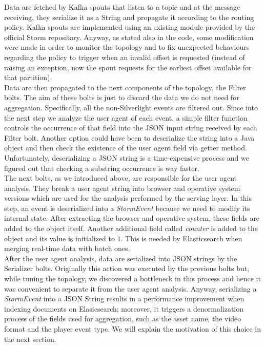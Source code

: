Data are fetched by Kafka spouts that listen to a topic and at the message receiving, they serialize it as a String and propagate it according to the routing policy. Kafka spouts are implemented using an existing module provided by the official Storm repository. Anyway, as stated also in the code, some modification were made in order to monitor the topology and to fix unexpected behaviours regarding the policy to trigger when an invalid offset is requested (instead of raising an exception, now the spout requests for the earliest offset available for that partition). \\
Data are then propagated to the next components of the topology, the Filter bolts. The aim of these bolts is just to discard the data we do not need for aggregation. Specifically, all the non-Silverlight events are filtered out. Since into the next step we analyze the user agent of each event, a simple filter function controls the occurrence of that field into the JSON input string received by each Filter bolt. Another option could have been to deserialize the string into a Java object and then check the existence of the user agent field via getter method. Unfortunately, deserializing a JSON string is a time-expensive process and we figured out that checking a substring occurrence is way faster.\\
The next bolts, as we introduced above, are responsible for the user agent analysis. They break a user agent string into browser and operative system versions which are used for the analysis performed by the serving layer. In this step, an event is deserialized into a \textit{StormEvent} because we need to modify its internal state. After extracting the browser and operative system, these fields are added to the object itself. Another additional field called \textit{counter} is added to the object and its value is initialized to $1$. This is needed by Elasticsearch when merging real-time data with batch ones. \\
After the user agent analysis, data are serialized into JSON strings by the Serializer bolts. Originally this action was executed by the previous bolts but, while tuning the topology, we discovered a bottleneck in this process and hence it was convenient to separate it from the user agent analysis. Anyway, serializing a \textit{StormEvent} into a JSON String results in a performance improvement when indexing documents on Elasicsearch; moreover, it triggers a denormalization process of the fields used for aggregation, such as the asset name, the video format and the player event type. We will explain the motivation of this choice in the next section.\\
